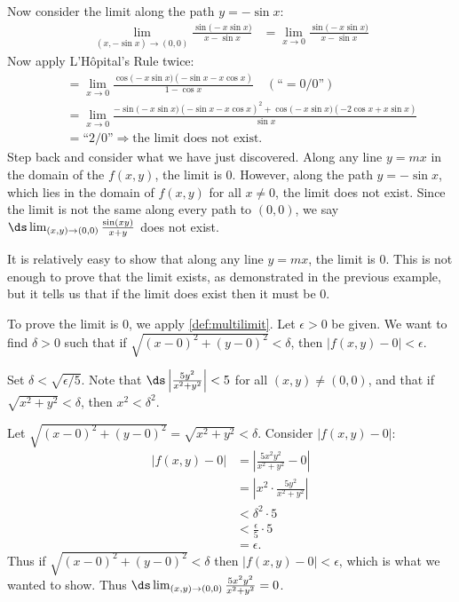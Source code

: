 {\begin{enumerate}
	Now consider the limit along the path $y=-\sin x$:
	\begin{align*}
	\lim_{(x,-\sin x)\to (0,0)} \frac{\sin\big(-x\sin x\big)}{x-\sin x} &= \lim_{x\to0} \frac{\sin\big(-x\sin x\big)}{x-\sin x}
	\end{align*}
	Now apply L'H\^opital's Rule twice:
	\small
	\begin{align*}
	 \quad &= \lim_{x\to 0}\frac{\cos\big(-x\sin x\big)(-\sin x-x\cos x)}{1-\cos x} \quad \left(\text{``}= 0/0\text{''}\right)\\
	&= \lim_{x\to 0}\frac{-\sin\big(-x\sin x\big)(-\sin x-x\cos x)^2+\cos\big(-x\sin x\big)(-2\cos x+x\sin x)}{\sin x}\\
	&= \text{``2/0''} \Rightarrow \text{the limit does not exist.}
	\end{align*}
	\normalsize
Step back and consider what we have just discovered. Along any line $y=mx$ in the domain of the $f(x,y)$, the limit is 0. However, along the path $y=-\sin x$, which lies in the domain of  $f(x,y)$ for all $x\neq 0$, the limit does not exist. Since the limit is not the same along every path to $(0,0)$, we say $\ds \lim_{(x,y)\to (0,0)}\frac{\sin(xy)}{x+y}$ does not exist.\eoehere
\end{enumerate}}

{It is relatively easy to show that along any line $y=mx$, the limit is 0. This is not enough to prove that the limit exists, as demonstrated in the previous example, but it tells us that if the limit does exist then it must be 0.

To prove the limit is 0, we apply \autoref{def:multilimit}. Let $\epsilon >0$ be given. We want to find $\delta >0$ such that if $\sqrt{(x-0)^2+(y-0)^2} <\delta$, then $|f(x,y)-0| <\epsilon$.

Set $\delta < \sqrt{\epsilon/5}$. Note that $\ds \left|\frac{5y^2}{x^2+y^2}\right| <5$ for all $(x,y)\neq (0,0)$, and that if $\sqrt{x^2+y^2} <\delta$, then $x^2<\delta^2$.

Let $\sqrt{(x-0)^2+(y-0)^2} = \sqrt{x^2+y^2}<\delta$. Consider $|f(x,y)-0|$:
\begin{align*}
|f(x,y)-0| &= \left|\frac{5x^2y^2}{x^2+y^2}-0\right| \\
				&= \left|x^2\cdot\frac{5y^2}{x^2+y^2}\right|\\
				&< \delta^2\cdot 5 \\
				&< \frac{\epsilon}{5}\cdot 5 \\
				&= \epsilon.
\end{align*}
Thus if $\sqrt{(x-0)^2+(y-0)^2}<\delta$ then $|f(x,y)-0|<\epsilon$, which is what we wanted to show. Thus $\ds \lim_{(x,y)\to(0,0)} \frac{5x^2y^2}{x^2+y^2} = 0$.}

